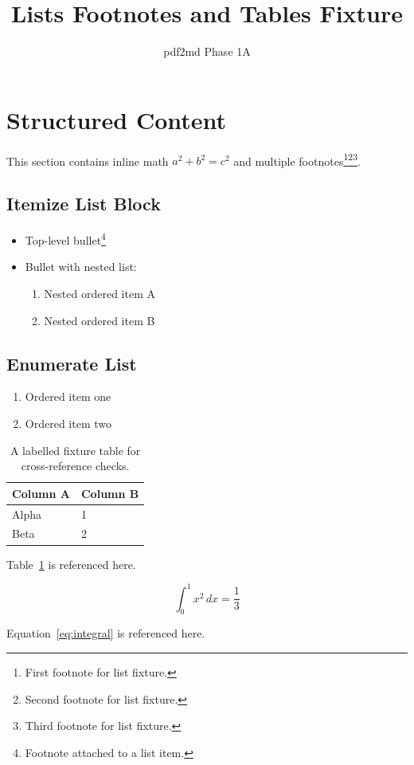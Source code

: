 \documentclass{article}
\title{Lists Footnotes and Tables Fixture}
\author{pdf2md Phase 1A}
\date{}
\begin{document}
\maketitle

\section{Structured Content}\label{sec:structured}
This section contains inline math $a^2 + b^2 = c^2$ and multiple footnotes\footnote{First footnote for list fixture.}\footnote{Second footnote for list fixture.}\footnote{Third footnote for list fixture.}.

\subsection{Itemize List Block}\label{subsec:itemize}
\begin{itemize}
  \item Top-level bullet\footnote{Footnote attached to a list item.}
  \item Bullet with nested list:
  \begin{enumerate}
    \item Nested ordered item A
    \item Nested ordered item B
  \end{enumerate}
\end{itemize}

\subsection*{Enumerate List}
\begin{enumerate}
  \item Ordered item one
  \item Ordered item two
\end{enumerate}

\begin{table}[h]
\centering
\begin{tabular}{ll}
\hline
Column A & Column B \\
\hline
Alpha & 1 \\
Beta & 2 \\
\hline
\end{tabular}
\caption{A labelled fixture table for cross-reference checks.}
\label{tab:fixture-table}
\end{table}

Table~\ref{tab:fixture-table} is referenced here.

\begin{equation}
\int_0^1 x^2\,dx = \frac{1}{3}
\label{eq:integral}
\end{equation}

Equation~\ref{eq:integral} is referenced here.
\end{document}
